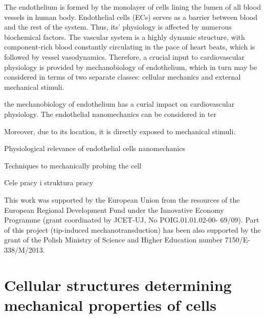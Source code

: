 The endothelium is formed by the monolayer of cells lining the lumen of all blood vessels in human body. Endothelial cells (ECs) serves as a barrier between blood and the rest of the system. Thus, its' physiology is affected by numerous biochemical factors. The vascular system is a highly dynamic structure, with component-rich blood constantly circulating in the pace of heart beats, which is followed by vessel vasodynamics. Therefore, a crucial input to cardiovascular physiology is provided by mechanobiology of endothelium, which in turn may be considered in terms of two separate classes: cellular mechanics and external mechanical stimuli.

the mechanobiology of endothelium has a curial impact on cardiovascular physiology. The endothelial nanomechanics can be considered in ter

Moreover, due to its location, it is directly exposed to mechanical stimuli.  

Physiological relevance of endothelial cells nanomechanics

\newline

Techniques to mechanically probing the cell

\newline

Cele pracy i struktura pracy

\newline

This work was supported by the European Union from the resources of the European Regional Development Fund under the Innovative Economy Programme (grant coordinated by JCET-UJ, No POIG.01.01.02-00- 69/09). Part of this project (tip-induced mechanotransduction) has been also supported by the grant of the Polish Ministry of Science and Higher Education number 7150/E-338/M/2013.


\section{Cellular structures determining mechanical properties of cells}